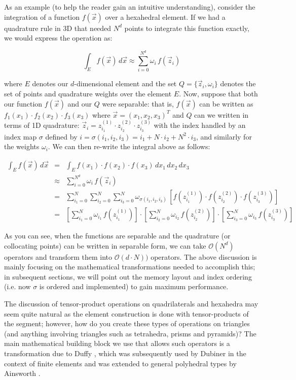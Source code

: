 As an example (to help the reader gain an intuitive understanding), consider the integration of a function $f(\vec{x})$ over a 
hexahedral element.  If we had a quadrature rule in 3D that needed $N^d$ points to integrate this function exactly, we would
express the operation as:

\begin{equation*}
\int_E f(\vec{x})\, d\vec{x} \approx \sum_{i=0}^{N^d} \omega_{i}\, f(\vec{z}_i)
\end{equation*}

\noindent where $E$ denotes our $d$-dimensional element and the set $Q = \{\vec{z}_i,\omega_i\}$ denotes the set of 
points and quadrature weights over the element $E$.  Now, suppose that both our function $f(\vec{x})$ and our $Q$ were
separable: that is, $f(\vec{x})$ can be written as $f_1(x_1)\cdot f_2(x_2)\cdot f_3(x_3)$ where $\vec{x} = (x_1,x_2,x_3)^T$
and $Q$ can we written in terms of 1D quadrature: $\vec{z}_i = z^{(1)}_{i_1}\cdot z^{(2)}_{i_2} \cdot z^{(3)}_{i_3}$ with
the index handled by an index map $\sigma$ defined by $i=\sigma(i_1,i_2,i_3)= i_1 + N\cdot i_2 + N^2 \cdot i_3$,
and similarly for the weights $\omega_i$.  We can then re-write the integral above as follows:

\begin{eqnarray*}
\int_E f(\vec{x})\, d\vec{x} &=& \int_E f(x_1)\cdot f(x_2) \cdot f(x_3)\,dx_1\,dx_2\,dx_3 \\
&\approx & \sum_{i=0}^{N^d} \omega_{i}\, f(\vec{z}_i) \\
&=& \sum_{i_1=0}^N \sum_{i_2=0}^N \sum_{i_3=0}^N \omega_{\sigma(i_1,i_2,i_3)}\, [f(z^{(1)}_{i_1})\cdot f(z^{(2)}_{i_2}) \cdot f(z^{(3)}_{i_3})] \\
&=& \left[ \sum_{i_1=0}^N \omega_{i_1}\,f(z^{(1)}_{i_1})\right]\cdot \left[ \sum_{i_2=0}^N \omega_{i_2}\,f(z^{(2)}_{i_2})\right] \cdot \left[ \sum_{i_3=0}^N \omega_{i_3}\,f(z^{(3)}_{i_3})\right]
\end{eqnarray*}

As you can see, when the functions are separable and the quadrature (or collocating points) can be written in separable form, we
can take $\mathcal{O}(N^d)$ operators and transform them into $\mathcal{O}(d\cdot N))$ operators.  The above discussion is
mainly focusing on the mathematical transformations needed to accomplish this; in subsequent sections, we will point out the 
memory layout and index ordering (i.e. now $\sigma$ is ordered and implemented) to gain maximum performance.

The discussion of tensor-product operations on quadrilaterals and hexahedra may seem quite natural as the element construction
is done with tensor-products of the segment; however, how do you create these types of operations on triangles (and anything
involving triangles such as tetrahedra, prisms and pyramids)?  The main mathematical building block we use that allows such
operators is a transformation due to Duffy \cite{Duffy82}, which was subsequently used by Dubiner \cite{Dubiner91} in the context
of finite elements  and was extended to general polyhedral types by Ainsworth \cite{AinsworthAD11,Ainsworth14}.

